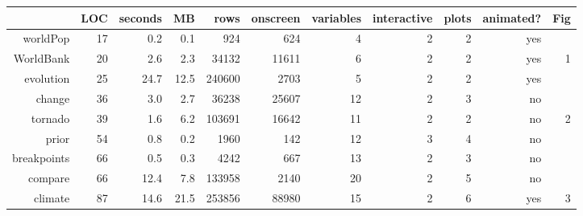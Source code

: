 \begin{tabular}{rrrrrrrrrrr}
  \hline
 & LOC & seconds & MB & rows & onscreen & variables & interactive & plots & animated? & Fig \\ 
  \hline
worldPop & 17 & 0.2 & 0.1 & 924 & 624 &  4 &  2 &  2 & yes &  \\ 
  WorldBank & 20 & 2.6 & 2.3 & 34132 & 11611 &  6 &  2 &  2 & yes &  1 \\ 
  evolution & 25 & 24.7 & 12.5 & 240600 & 2703 &  5 &  2 &  2 & yes &  \\ 
  change & 36 & 3.0 & 2.7 & 36238 & 25607 & 12 &  2 &  3 & no &  \\ 
  tornado & 39 & 1.6 & 6.2 & 103691 & 16642 & 11 &  2 &  2 & no &  2 \\ 
  prior & 54 & 0.8 & 0.2 & 1960 & 142 & 12 &  3 &  4 & no &  \\ 
  breakpoints & 66 & 0.5 & 0.3 & 4242 & 667 & 13 &  2 &  3 & no &  \\ 
  compare & 66 & 12.4 & 7.8 & 133958 & 2140 & 20 &  2 &  5 & no &  \\ 
  climate & 87 & 14.6 & 21.5 & 253856 & 88980 & 15 &  2 &  6 & yes &  3 \\ 
   \hline
\end{tabular}
